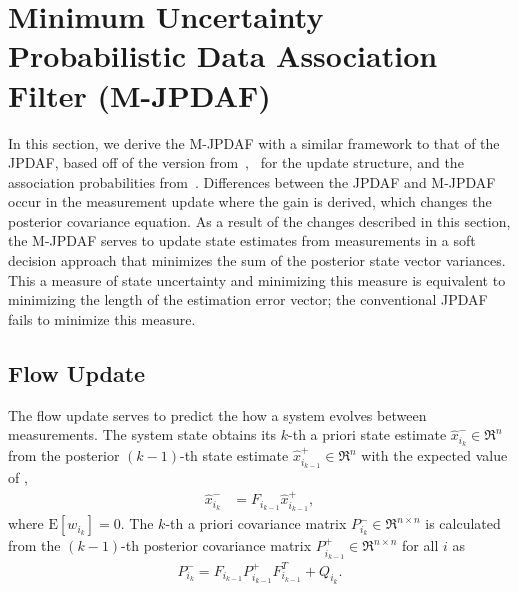 


\section{Minimum Uncertainty Probabilistic Data Association Filter (M-JPDAF)}
\label{sec:M-JPDAF}

In this section, we derive the M-JPDAF with a similar framework to that of the JPDAF, based off of the version from~\cite{TrackDataAssoc},~\cite{JPDAF1} for the update structure, and the association probabilities from~\cite{Bar1990}.
Differences between the JPDAF and M-JPDAF occur in the measurement update where the gain is derived, which changes the posterior covariance equation.
As a result of the changes described in this section, the M-JPDAF serves to update state estimates from measurements in a soft decision approach that minimizes the sum of the posterior state vector variances. This a measure of state uncertainty and minimizing this measure is equivalent to minimizing the length of the estimation error vector; the conventional JPDAF fails to minimize this measure.

\subsection{Flow Update}

The flow update serves to predict the how a system evolves between measurements. The system state obtains its $k$-th a priori state estimate $\hat x_{i_k}^-\in\Re^n$ from the posterior $(k-1)$-th state estimate $\hat x_{i_{k-1}}^+\in\Re^n$ with the expected value of ,
\begin{align}
\label{eqn:xestapriori}
\hat x_{i_{k}}^- & = F_{i_{k-1}} \hat x_{i_{k-1}}^+,
\end{align}
where $\mathrm{E}[w_{i_{k}}]=0$. The $k$-th a priori covariance matrix $P_{i_k}^-\in\Re^{n\times n}$ is calculated from the $(k-1)$-th posterior covariance matrix $P_{i_{k-1}}^+\in\Re^{n\times n}$ for all $i$ as
\begin{gather}
\label{eqn:Papriori}
P_{i_{k}}^- = F_{i_{k-1}} P_{i_{k-1}}^+ F_{i_{k-1}}^T + Q_{i_{k}}.
\end{gather}


